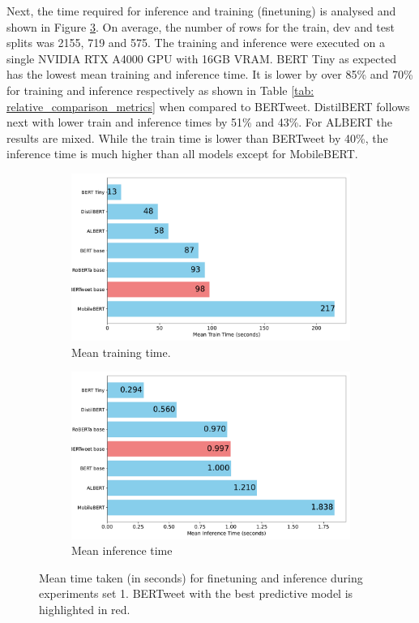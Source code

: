 Next, the time required for inference and training (finetuning) is analysed and shown in Figure \ref{fig: mean_time_taken}. On average, the number of rows for the train, dev and test splits was 2155, 719 and 575. The training and inference were executed on a single NVIDIA RTX A4000 GPU with 16GB VRAM. BERT Tiny as expected has the lowest mean training and inference time. It is lower by over 85\% and 70\% for training and inference respectively as shown in Table \ref{tab: relative_comparison_metrics} when compared to BERTweet. DistilBERT follows next with lower train and inference times by 51\% and 43\%. For ALBERT the results are mixed. While the train time is lower than BERTweet by 40\%, the inference time is much higher than all models except for MobileBERT. 
\begin{figure}[htbp]
    \centering
    \captionsetup{font=small}
    \begin{subfigure}{0.49\textwidth}
        \centering
        \includegraphics[width=\linewidth]{figures/mean_train_time.pdf}
        \caption{Mean training time.}
        \label{fig: mean_train_time}
    \end{subfigure}
    \hfill
    \begin{subfigure}{0.49\textwidth}
        \centering
        \includegraphics[width=\linewidth]{figures/mean_inference_time.pdf}
        \caption{Mean inference time}
        \label{fig: mean_inf_time}
    \end{subfigure}
    \caption{Mean time taken (in seconds) for finetuning and inference during experiments set 1. BERTweet with the best predictive model is highlighted in red.}
    \label{fig: mean_time_taken}
\end{figure}




